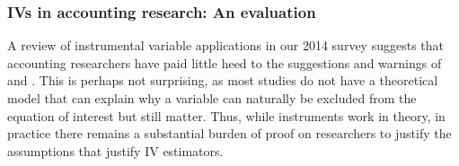 \documentclass[12pt,reqno,titlepage]{amsart}
\theoremstyle{definition}
\begin{document}
\begin{doublespace}
\subsubsection{IVs in accounting research: An evaluation}
A review of instrumental variable applications in our 2014 survey suggests that accounting researchers have paid little heed to the suggestions and warnings of  \citet{Larcker:2010fq,Lennox:2012it} and \citet{Roberts:2013cz}.
This is perhaps not surprising, as most studies do not have a theoretical model that can explain why a variable can naturally be excluded from
the equation of interest but still matter. 
Thus, while instruments work in theory, in practice there remains a substantial burden of proof on researchers to justify the assumptions that justify IV estimators.
 

\end{doublespace}
\end{document}
